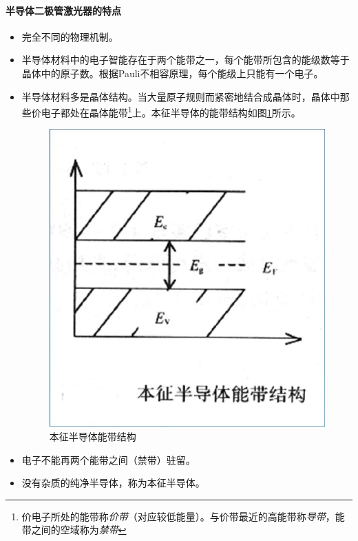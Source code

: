 \paragraph{半导体二极管激光器的特点}
\begin{itemize}
	\item 完全不同的物理机制。
	\item 半导体材料中的电子智能存在于两个能带之一，每个能带所包含的能级数等于晶体中的原子数。根据Pauli不相容原理，每个能级上只能有一个电子。
	\item 半导体材料多是晶体结构。当大量原子规则而紧密地结合成晶体时，晶体中那些价电子都处在晶体能带\footnote{价电子所处的能带称\textit{价带}（对应较低能量）。与价带最近的高能带称\textit{导带}，能带之间的空域称为\textit{禁带}}上。本征半导体的能带结构如图\ref{fig:本征半导体能带结构}所示。
		\begin{figure}[htbp]
			\centering
			\includegraphics[width=0.3\linewidth]{figure/Chapter2/本征半导体能带结构}
			\caption{本征半导体能带结构}
			\label{fig:本征半导体能带结构}
		\end{figure}
	\item 电子不能再两个能带之间（禁带）驻留。
	\item 没有杂质的纯净半导体，称为本征半导体。
\end{itemize}

